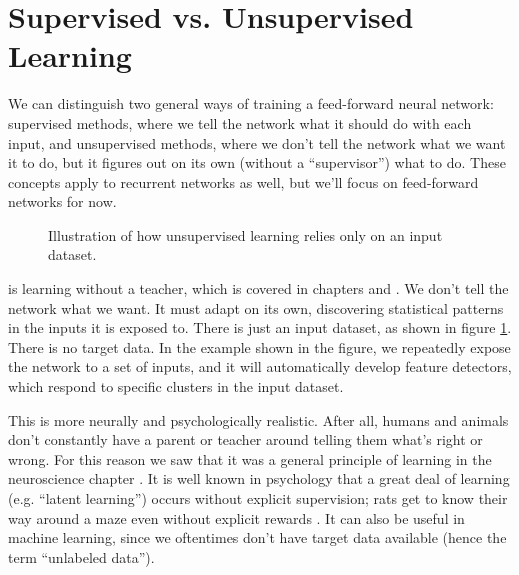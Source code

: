 
\section{Supervised vs. Unsupervised Learning}


We can distinguish two general ways of training a feed-forward neural network: supervised methods, where we tell the network what it should do with each input, and unsupervised methods, where we don't tell the network what we want it to do, but it figures out on its own (without a ``supervisor'') what to do. These concepts apply to recurrent networks as well, but we'll focus on feed-forward networks for now.

\begin{figure}[h]
\centering
{}
\caption[Simbrain screenshot with graphical elements added by Pamela Payne.]{Illustration of how unsupervised learning relies only on an input dataset.}
\label{unsupervised_learning}
\end{figure}

  is learning without a teacher, which is covered in chapters  and . We don't tell the network what we want. It must adapt on its own, discovering statistical patterns in the inputs it is exposed to. There is just an input dataset, as shown in figure \ref{unsupervised_learning}. There is no target data. In the example shown in the figure, we repeatedly expose the network to a set of inputs, and it will automatically develop feature detectors, which respond to specific clusters in the input dataset.

This is more neurally and psychologically realistic. After all, humans and animals don't constantly have a parent or teacher around telling them what's right or wrong. For this reason we saw that it was a general principle of learning in the neuroscience chapter . It is well known in psychology that a great deal of learning (e.g. ``latent learning'') occurs without explicit supervision; rats get to know their way around a maze even without explicit rewards \cite{wang2021latent}. It can also be useful in  machine learning, since we oftentimes don't have target data available (hence the term ``unlabeled data''). 

